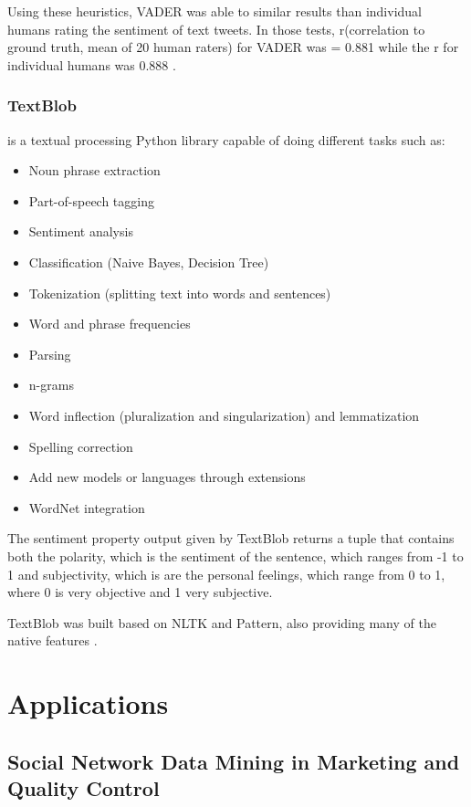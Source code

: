\documentclass[runningheads]{llncs}
\begin{document}
Using these heuristics, VADER was able to similar results than individual humans rating the sentiment of text tweets. In those tests, r(correlation to ground truth, mean of 20 human raters) for VADER was = 0.881 while the r for individual humans was 0.888 \cite{Hutto_Gilbert_2014}.  

\subsubsection{TextBlob} is a textual processing Python library capable of doing different tasks such as: 

\begin{itemize}
	\item Noun phrase extraction 
	\item Part-of-speech tagging 
	\item Sentiment analysis 
	\item Classification (Naive Bayes, Decision Tree) 
	\item Tokenization (splitting text into words and sentences) 
	\item Word and phrase frequencies 
	\item Parsing 
	\item n-grams 
	\item Word inflection (pluralization and singularization) and lemmatization 
	\item Spelling correction 
	\item Add new models or languages through extensions 
	\item WordNet integration 
\end{itemize}
 

The sentiment property output given by TextBlob returns a tuple that contains both the polarity, which is the sentiment of the sentence, which ranges from -1 to 1 and subjectivity, which is are the personal feelings, which range from 0 to 1, where 0 is very objective and 1 very subjective. 

TextBlob was built based on NLTK and Pattern, also providing many of the native features \cite{loria2018textblob}.

\section{Applications}

\subsection{Social Network Data Mining in Marketing and Quality Control}
\end{document}
